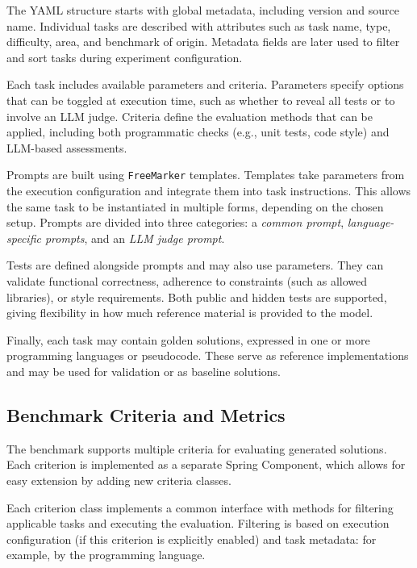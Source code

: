 The YAML structure starts with global metadata, including version and source name.
Individual tasks are described with attributes such as task name, type, difficulty, area, and benchmark of origin.
Metadata fields are later used to filter and sort tasks during experiment configuration.

Each task includes available parameters and criteria.
Parameters specify options that can be toggled at execution time, such as whether to reveal all tests or to involve an LLM judge.
Criteria define the evaluation methods that can be applied, including both programmatic checks (e.g., unit tests, code style) and LLM-based assessments.

Prompts are built using \texttt{FreeMarker} templates. Templates take parameters from the execution configuration and integrate them into task instructions.
This allows the same task to be instantiated in multiple forms, depending on the chosen setup.
Prompts are divided into three categories: a \emph{common prompt}, \emph{language-specific prompts}, and an \emph{LLM judge prompt}.

Tests are defined alongside prompts and may also use parameters.
They can validate functional correctness, adherence to constraints (such as allowed libraries), or style requirements.
Both public and hidden tests are supported, giving flexibility in how much reference material is provided to the model.

Finally, each task may contain golden solutions, expressed in one or more programming languages or pseudocode.
These serve as reference implementations and may be used for validation or as baseline solutions.

\subsection{Benchmark Criteria and Metrics}

The benchmark supports multiple criteria for evaluating generated solutions.
Each criterion is implemented as a separate Spring Component, which allows for easy extension by adding new criteria classes.

Each criterion class implements a common interface with methods for filtering applicable tasks and executing the evaluation.
Filtering is based on execution configuration (if this criterion is explicitly enabled) and task metadata: for example, by the programming language.

